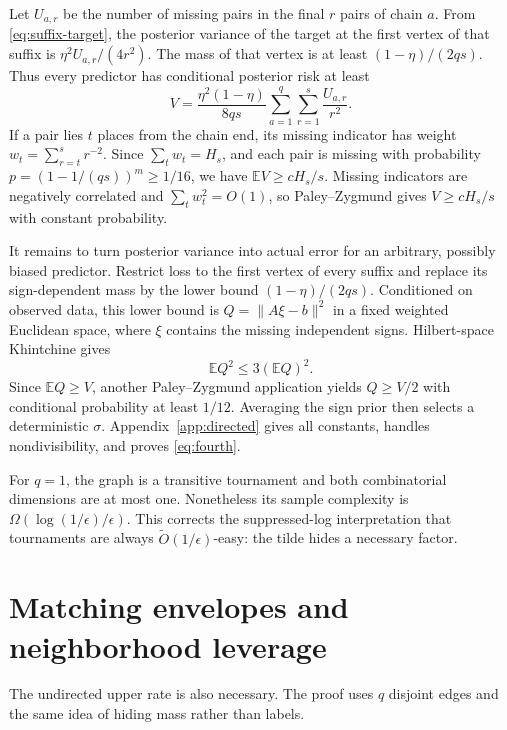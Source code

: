\documentclass{article}
\newcommand{\E}{\mathbb E}
\newcommand{\1}{\mathbf 1}
\begin{document}
Let $U_{a,r}$ be the number of missing pairs in the final $r$ pairs of chain $a$. From \eqref{eq:suffix-target}, the posterior variance of the target at the first vertex of that suffix is $\eta^2U_{a,r}/(4r^2)$. The mass of that vertex is at least $(1-\eta)/(2qs)$. Thus every predictor has conditional posterior risk at least
\begin{equation}
 V=\frac{\eta^2(1-\eta)}{8qs}
 \sum_{a=1}^q\sum_{r=1}^s\frac{U_{a,r}}{r^2}.
 \label{eq:posterior-v}
\end{equation}
If a pair lies $t$ places from the chain end, its missing indicator has weight $w_t=\sum_{r=t}^s r^{-2}$. Since $\sum_t w_t=H_s$, and each pair is missing with probability $p=(1-1/(qs))^m\ge1/16$, we have $\E V\ge cH_s/s$. Missing indicators are negatively correlated and $\sum_t w_t^2=O(1)$, so Paley--Zygmund gives $V\ge cH_s/s$ with constant probability.

It remains to turn posterior variance into actual error for an arbitrary, possibly biased predictor. Restrict loss to the first vertex of every suffix and replace its sign-dependent mass by the lower bound $(1-\eta)/(2qs)$. Conditioned on observed data, this lower bound is $Q=\|A\xi-b\|^2$ in a fixed weighted Euclidean space, where $\xi$ contains the missing independent signs. Hilbert-space Khintchine gives
\begin{equation}
 \E Q^2\le3(\E Q)^2.
 \label{eq:fourth}
\end{equation}
Since $\E Q\ge V$, another Paley--Zygmund application yields $Q\ge V/2$ with conditional probability at least $1/12$. Averaging the sign prior then selects a deterministic $\sigma$. Appendix~\ref{app:directed} gives all constants, handles nondivisibility, and proves \eqref{eq:fourth}.

For $q=1$, the graph is a transitive tournament and both combinatorial dimensions are at most one. Nonetheless its sample complexity is $\Omega(\log(1/\epsilon)/\epsilon)$. This corrects the suppressed-log interpretation that tournaments are always $\widetilde O(1/\epsilon)$-easy: the tilde hides a necessary factor.

\section{Matching envelopes and neighborhood leverage}

The undirected upper rate is also necessary. The proof uses $q$ disjoint edges and the same idea of hiding mass rather than labels.
\end{document}
